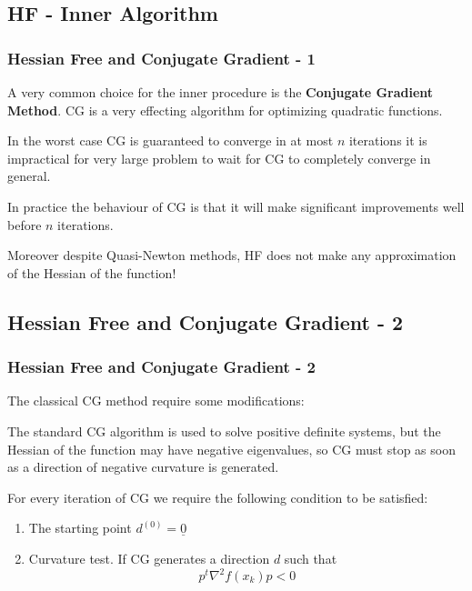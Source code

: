 \documentclass[professionalfont]{beamer}
\begin{document}
  \subsection{HF - Inner Algorithm}
  \begin{frame}
    \frametitle{Hessian Free and Conjugate Gradient - 1}
    A very common choice for the inner procedure is the \textbf{Conjugate Gradient Method}.\newline\newline
    CG is a very effecting algorithm for optimizing quadratic functions. \newline \newline

    In the worst case CG is guaranteed to converge in at most $n$ iterations it is impractical for very large problem
    to wait for CG to completely converge in general.\newline\newline

    In practice the behaviour of CG is that it will make significant improvements well before $n$ iterations.

    Moreover despite Quasi-Newton methods, HF does not make any approximation of the Hessian of the function!


  \end{frame}

  \subsection{Hessian Free and Conjugate Gradient - 2}
  \begin{frame}
    \frametitle{Hessian Free and Conjugate Gradient - 2}
    The classical CG method require some modifications:\newline\newline

    The standard CG algorithm is used to solve positive definite systems, but the Hessian
    of the function may have negative eigenvalues, so CG must stop as soon as a direction of negative curvature is generated.\newline\newline

    For every iteration of CG we require the following condition to be satisfied:
    \begin{enumerate}
      \item The starting point $d^{(0)} = \underline{0}$
      \item Curvature test. If CG generates a direction $d$ such that
        \begin{equation*}
          p^{t} \nabla^2 f(x_k) p < 0
        \end{equation*}

    \end{enumerate}

  \end{frame}
\end{document}

